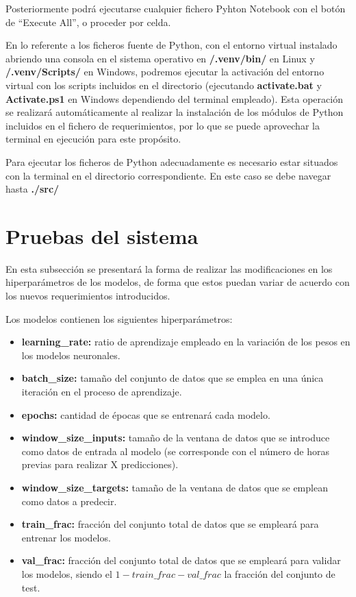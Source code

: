 
Posteriormente podrá ejecutarse cualquier fichero Pyhton Notebook con el botón de ``Execute All'', o proceder por celda.

En lo referente a los ficheros fuente de Python, con el entorno virtual instalado abriendo una consola en el sistema operativo en \textbf{/.venv/bin/} en Linux y \textbf{/.venv/Scripts/}
en Windows, podremos ejecutar la activación del entorno virtual con los scripts incluidos en el directorio (ejecutando \linebreak \textbf{activate.bat} y \textbf{Activate.ps1} en Windows dependiendo del terminal empleado).
Esta operación se realizará automáticamente al realizar la instalación de los módulos de Python incluidos en el fichero de requerimientos, por lo que se puede aprovechar la terminal en ejecución para 
este propósito.

Para ejecutar los ficheros de Python adecuadamente es necesario estar situados con la terminal en el directorio correspondiente. En este caso se debe navegar hasta \textbf{./src/}

\section{Pruebas del sistema}
En esta subsección se presentará la forma de realizar las modificaciones en los hiperparámetros de los modelos, de forma que estos puedan variar de acuerdo con los nuevos requerimientos introducidos.

Los modelos contienen los siguientes hiperparámetros:
\begin{itemize}
    \item \textbf{learning\_rate:} ratio de aprendizaje empleado en la variación de los pesos en los modelos neuronales.
    \item \textbf{batch\_size:} tamaño del conjunto de datos que se emplea en una única iteración en el proceso
        de aprendizaje.
    \item \textbf{epochs:} cantidad de épocas que se entrenará cada modelo.
    \item \textbf{window\_size\_inputs:} tamaño de la ventana de datos que se introduce como datos de entrada al modelo
        (se corresponde con el número de horas previas para realizar X predicciones).
    \item \textbf{window\_size\_targets:} tamaño de la ventana de datos que se emplean como datos a predecir.
    \item \textbf{train\_frac:} fracción del conjunto total de datos que se empleará para entrenar los modelos.
    \item \textbf{val\_frac:} fracción del conjunto total de datos que se empleará para validar los modelos, siendo el 
        \(1 - train\_frac - val\_frac\) la fracción del conjunto de test.
\end{itemize}

